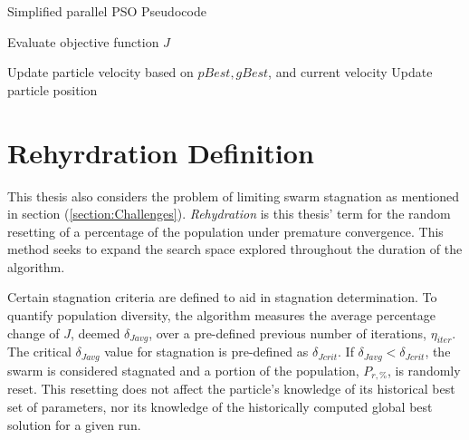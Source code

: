 \begin{algorithm}[H]
    \caption{Simplified parallel PSO Pseudocode}
    \begin{algorithmic}
    \STATE Evaluate objective function $J$
    \hspace{17em}

    \ENDFOR
    \STATE Update particle velocity based on $pBest, gBest$, and current velocity
    \STATE Update particle position
    \ENDFOR
    \end{algorithmic}
    \label{alg:PPSOpsuedocode}
\end{algorithm}


\section{Rehyrdration Definition}

\noindent This thesis also considers the problem of limiting swarm stagnation as mentioned in section (\ref{section:Challenges}).
\textit{Rehydration} is this thesis' term for the random resetting of a percentage of the population under premature convergence.
This method seeks to expand the search space explored throughout the duration of the algorithm. \newline

\noindent Certain stagnation criteria are defined to aid in stagnation determination. To quantify population diversity, the algorithm measures the average
percentage change of $J$, deemed $\delta_{Javg}$, over a pre-defined previous number of iterations, $\eta_{iter}$. The critical 
$\delta_{Javg}$ value for stagnation is pre-defined as $\delta_{Jcrit}$.  If $\delta_{Javg} < \delta_{Jcrit}$, the swarm is considered
stagnated and a portion of the population, $P_{r,\text{\%}}$, is randomly reset. This resetting does not affect the particle's knowledge of its
historical best set of parameters, nor its knowledge of the historically computed global best solution for a given run.\newline

\newpage
